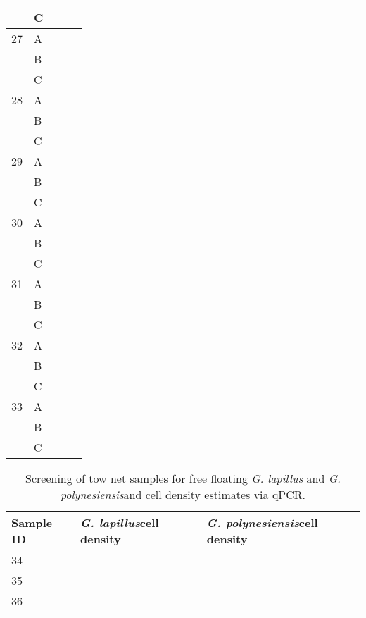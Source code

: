 \documentclass[12pt]{article}
\begin{document}
\begin{longtable}{ | p{1cm} | p{1cm} | p{3cm} | p{4cm} | p{4cm} | }
\hline
&C&&&\\
\hline
27&A&&&\\
\hline
&B&&&\\
\hline
&C&&&\\
\hline
28&A&&&\\
\hline
&B&&&\\
\hline
&C&&&\\
\hline
29&A&&&\\
\hline
&B&&&\\
\hline
&C&&&\\
\hline
30&A&&&\\
\hline
&B&&&\\
\hline
&C&&&\\
\hline
31&A&&&\\
\hline
&B&&&\\
\hline
&C&&&\\
\hline
32&A&&&\\
\hline
&B&&&\\
\hline
&C&&&\\
\hline
33&A&&&\\
\hline
&B&&&\\
\hline
&C&&&\\
 \hline
\end{longtable}
\FloatBarrier

\FloatBarrier
\begin{table}
\caption{Screening of tow net samples for free floating \emph{G. lapillus} and \emph{G. polynesiensis}and cell density estimates via qPCR.}
\label{tbl:NetTable}
\begin{tabular}{  | p{4cm} |  p{4cm} | p{4cm} | }
\hline
\textbf{Sample ID}  & \textbf{\emph{G. lapillus}cell density} & \textbf{\emph{G. polynesiensis}cell density}  \\
\hline
34 &&\\
\hline
35&&\\
\hline
36&&\\
\hline
 \end{tabular}
\end{table}
\FloatBarrier
\newpage
\end{document}
